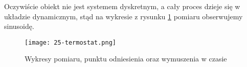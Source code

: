 Oczywiście obiekt nie jest systemem dyskretnym, a cały proces dzieje się w układzie dynamicznym, stąd na wykresie z rysunku \ref{fig:25-termostat} pomiaru obserwujemy sinusoidę. 

\begin{figure}[!h]
    \centering \texttt{[image: 25-termostat.png]}
    \caption{Wykresy pomiaru, punktu odniesienia oraz wymuszenia w czasie}\label{fig:25-termostat}
\end{figure}

